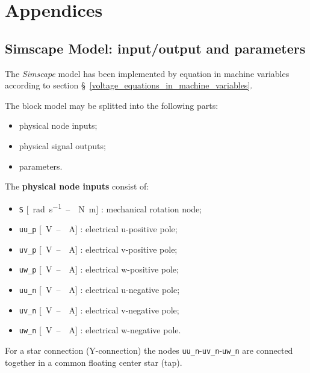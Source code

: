 \documentclass[11pt,a4paper,oneside]{book}
\numberwithin{equation}{section}
\theoremstyle{it}
\theoremstyle{definition}
\begin{document}
\chapter{Appendices}

\section{Simscape Model: input/output and parameters}
The \textit{Simscape} model has been implemented by equation in machine variables according to section §~\ref{voltage_equations_in_machine_variables}.

The block model may be splitted into the following parts:
\begin{itemize}
	\item[--] physical node inputs;
	\item[--] physical signal outputs;
	\item[--] parameters.
\end{itemize} 

\noindent The \textbf{physical node inputs} consist of: 
\begin{itemize}
	\item[--] \texttt{S} [\SI{}{\radian\per\second}~--~\SI{}{\newton\meter}] : mechanical rotation node;
	\item[--] \texttt{uu\_p} [\SI{}{\volt}~--~\SI{}{\ampere}] : electrical u-positive pole;
	\item[--] \texttt{uv\_p} [\SI{}{\volt}~--~\SI{}{\ampere}] : electrical v-positive pole;
	\item[--] \texttt{uw\_p} [\SI{}{\volt}~--~\SI{}{\ampere}] : electrical w-positive pole;
	\item[--] \texttt{uu\_n} [\SI{}{\volt}~--~\SI{}{\ampere}] : electrical u-negative pole;
	\item[--] \texttt{uv\_n} [\SI{}{\volt}~--~\SI{}{\ampere}] : electrical v-negative pole;
	\item[--] \texttt{uw\_n} [\SI{}{\volt}~--~\SI{}{\ampere}] : electrical w-negative pole.
\end{itemize} 
For a star connection (Y-connection) the nodes \texttt{uu\_n}-\texttt{uv\_n}-\texttt{uw\_n} are connected together in a common floating center star (tap).
\end{document}

